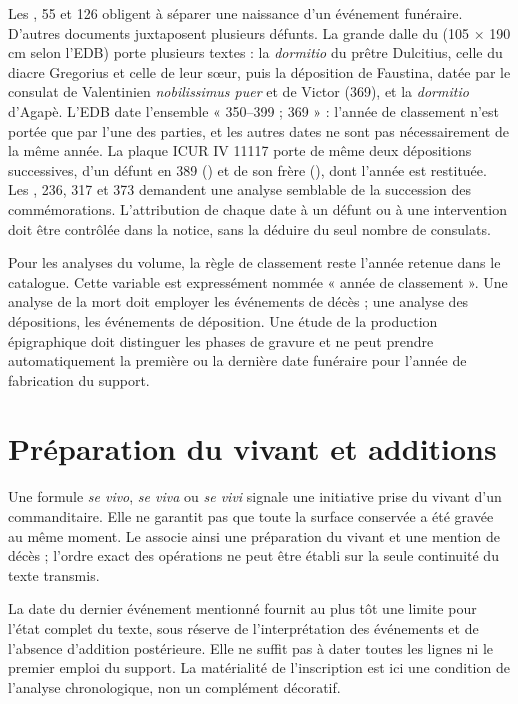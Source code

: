 Les , 55 et 126 obligent à séparer une naissance d’un événement funéraire. D’autres documents juxtaposent plusieurs défunts. La grande dalle du  (105 × 190 cm selon l’EDB) porte plusieurs textes : la \emph{dormitio} du prêtre Dulcitius, celle du diacre Gregorius et celle de leur sœur, puis la déposition de Faustina, datée par le consulat de Valentinien \emph{nobilissimus puer} et de Victor (369), et la \emph{dormitio} d’Agapè. L’EDB date l’ensemble « 350–399 ; 369 » : l’année de classement n’est portée que par l’une des parties, et les autres dates ne sont pas nécessairement de la même année. La plaque ICUR IV 11117 porte de même deux dépositions successives, d’un défunt en 389 () et de son frère (), dont l’année est restituée. Les , 236, 317 et 373 demandent une analyse semblable de la succession des commémorations. L’attribution de chaque date à un défunt ou à une intervention doit être contrôlée dans la notice, sans la déduire du seul nombre de consulats.

Pour les analyses du volume, la règle de classement reste l’année retenue dans le catalogue. Cette variable est expressément nommée « année de classement ». Une analyse de la mort doit employer les événements de décès ; une analyse des dépositions, les événements de déposition. Une étude de la production épigraphique doit distinguer les phases de gravure et ne peut prendre automatiquement la première ou la dernière date funéraire pour l’année de fabrication du support.

\section{Préparation du vivant et additions}

Une formule \emph{se vivo}, \emph{se viva} ou \emph{se vivi} signale une initiative prise du vivant d’un commanditaire. Elle ne garantit pas que toute la surface conservée a été gravée au même moment. Le  associe ainsi une préparation du vivant et une mention de décès ; l’ordre exact des opérations ne peut être établi sur la seule continuité du texte transmis.

La date du dernier événement mentionné fournit au plus tôt une limite pour l’état complet du texte, sous réserve de l’interprétation des événements et de l’absence d’addition postérieure. Elle ne suffit pas à dater toutes les lignes ni le premier emploi du support. La matérialité de l’inscription est ici une condition de l’analyse chronologique, non un complément décoratif.

